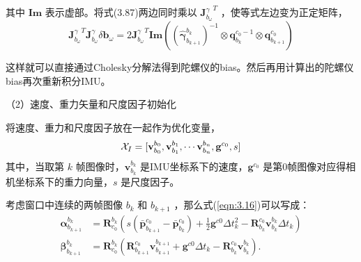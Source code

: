 其中 $\mathbf{Im} $ 表示虚部。将式(3.87)两边同时乘以 ${\mathbf{J}_{b_{\omega}}^{\gamma}}^{T}$ ，使等式左边变为正定矩阵，
\begin{equation}
\label{eqn:3.88}
{\mathbf{J}_{b_{\omega}}^{\gamma}}^{T}
\mathbf{J}_{b_{\omega}}^{\gamma} \delta \mathbf{b}_{\omega} = 
2 {\mathbf{J}_{b_{\omega}}^{\gamma}}^{T} \mathbf{Im}\left( (\hat{\bm{\gamma}}_{b_{k+1}}^{b_{k}})^{-1} \otimes \mathbf{q}_{b_{k}}^{c_{0}-1} \otimes \mathbf{q}_{b_{k+1}}^{c_{0}}\right)
\end{equation}

这样就可以直接通过Cholesky分解法得到陀螺仪的bias。然后再用计算出的陀螺仪bias再次重新积分IMU。

（2）速度、重力矢量和尺度因子初始化

将速度、重力和尺度因子放在一起作为优化变量，
\begin{equation}
\label{eqn:3.89}
\setlength{\abovedisplayskip}{6pt}
\setlength{\belowdisplayskip}{6pt}
\mathcal{X}_I=[\mathbf{v}_{b_0}^{b_0},\mathbf{v}_{b_1}^{b_1},\cdots\mathbf{v}_{b_n}^{b_n},\mathbf{g}^{c_0},s]
\end{equation}
其中，当取第 $k$ 帧图像时，$\mathbf{v}_{b_k}^{b_k} $ 是IMU坐标系下的速度，$ \mathbf{g}^{c_0} $ 是第0帧图像对应得相机坐标系下的重力向量，$s $ 是尺度因子。

考虑窗口中连续的两帧图像 $b_{k} $ 和 $b_{k+1} $ ，那么式(\ref{eqn:3.16})可以写成：
\begin{equation}
\label{eqn:3.90}
\begin{split}
\bm{\alpha}_{b_{k+1}}^{b_k}&=  
\mathbf{R}_{c_0}^{b_k}(s(\bar{\mathbf{p}}_{b_{k+1}}^{c_0}-\bar{\mathbf{p}}_{b_k}^{c_0})+\frac{1}{2}\mathbf{g}^{c0}\Delta t_k^2-\mathbf{R}_{b_k}^{c_0}\mathbf{v}_{b_k}^{b_k}\Delta t_k) \\
\bm{\beta}_{b_{k+1}}^{b_k}&=
\mathbf{R}_{c_0}^{b_k}(\mathbf{R}_{b_{k+1}}^{c_0}\mathbf{v}_{b_{k+1}}^{b_{k+1}}+\mathbf{g}^{c0}\Delta t_k-\mathbf{R}_{b_k}^{c_0}\mathbf{v}_{b_k}^{b_k}).
\end{split}
\end{equation}

